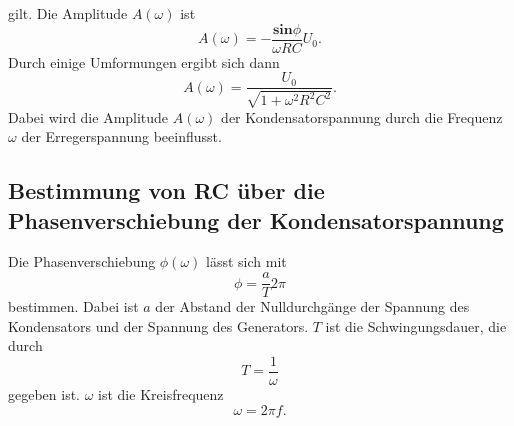 gilt. Die Amplitude $A(\omega)$ ist
\begin{equation} 
    A(\omega) = - \frac{\mathbf{sin}\phi}{\omega RC} U_{0}.
    \label{eqn: A1}
\end{equation}
Durch einige Umformungen ergibt sich dann 
\begin{equation}
A(\omega) = \frac{U_{0}}{\sqrt{1 + \omega^2 R^2 C^2}}.
\label{eqn: A2}
\end{equation}
Dabei wird die Amplitude $A(\omega)$ der Kondensatorspannung durch die Frequenz $\omega$ der Erregerspannung beeinflusst.

\subsection{Bestimmung von RC über die Phasenverschiebung der Kondensatorspannung}
Die Phasenverschiebung $\phi(\omega)$ lässt sich mit
\begin{equation}
    \phi = \frac{a}{T}2\pi
\end{equation}
bestimmen. Dabei ist $a$ der Abstand der Nulldurchgänge der Spannung des Kondensators und der Spannung des Generators.
$T$ ist die Schwingungsdauer, die durch
\begin{equation*}
    T = \frac{1}{\omega}
\end{equation*}
gegeben ist. $\omega$ ist die Kreisfrequenz
\begin{equation*}
    \omega = 2\pi f.
\end{equation*}

